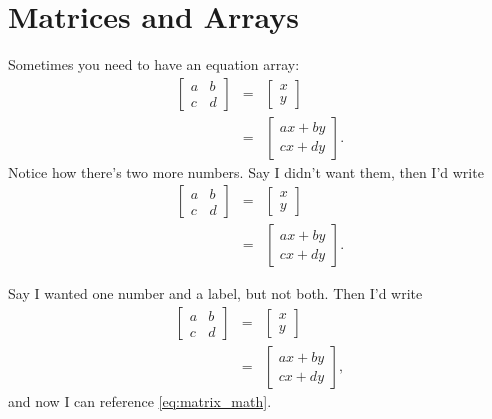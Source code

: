 \documentclass[11pt]{article}
\begin{document}
\section{Matrices and Arrays}
Sometimes you need to have an equation array:
\begin{eqnarray}
	\left[
	\begin{array}{cc}
		a & b \\
		c & d
	\end{array}
	\right]
	& = &
	\left[
	\begin{array}{c}
		x \\
		y
	\end{array}
	\right] \\
	& = &
	\left[
	\begin{array}{c}
		a x + b y \\
		c x + d y
	\end{array}
	\right] .
\end{eqnarray}
%
Notice how there's two more numbers. Say I didn't want them, then I'd write 
%
\begin{eqnarray*}
	\left[
	\begin{array}{cc}
		a & b \\
		c & d
	\end{array}
	\right]
	& = &
	\left[
	\begin{array}{c}
		x \\
		y
	\end{array}
	\right] \\
	& = &
	\left[
	\begin{array}{c}
		a x + b y \\
		c x + d y
	\end{array}
	\right] .
\end{eqnarray*}
%

Say I wanted one number and a label, but not both. Then I'd write
%
\begin{eqnarray}
	\left[
	\begin{array}{cc}
		a & b \\
		c & d
	\end{array}
	\right]
	& = &
	\left[
	\begin{array}{c}
		x \\
		y
	\end{array}
	\right] \label{eq:matrix_math} \\
	& = &
	\left[
	\begin{array}{c}
		a x + b y \\
		c x + d y
	\end{array}
	\right] , \nonumber
\end{eqnarray}
%
and now I can reference \eqref{eq:matrix_math}.
\end{document}
